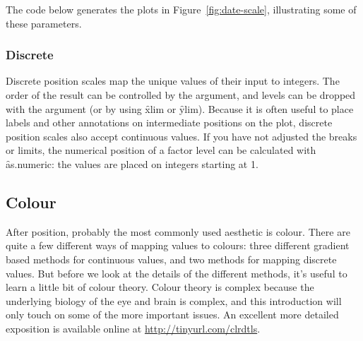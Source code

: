 The code below generates the plots in Figure~\ref{fig:date-scale}, illustrating some of these parameters.

% 


\subsubsection{Discrete}
\label{sub:scale-discrete}

Discrete position scales map the unique values of their input to integers.  The order of the result can be controlled by the  argument, and levels can be dropped with the  argument (or by using \f{xlim} or \f{ylim}).  Because it is often useful to place labels and other annotations on intermediate positions on the plot, discrete position scales also accept continuous values.  If you have not adjusted the breaks or limits, the numerical position of a factor level can be calculated with \f{as.numeric}: the values are placed on integers starting at 1.    


\subsection{Colour}
\label{sub:scale-colour}

After position, probably the most commonly used aesthetic is colour. There are quite a few different ways of mapping values to colours: three different gradient based methods for continuous values, and two methods for mapping discrete values. But before we look at the details of the different methods, it's useful to learn a little bit of colour theory. Colour theory is complex because the underlying biology of the eye and brain is complex, and this introduction will only touch on some of the more important issues. An excellent more detailed exposition is available online at \url{http://tinyurl.com/clrdtls}.  

